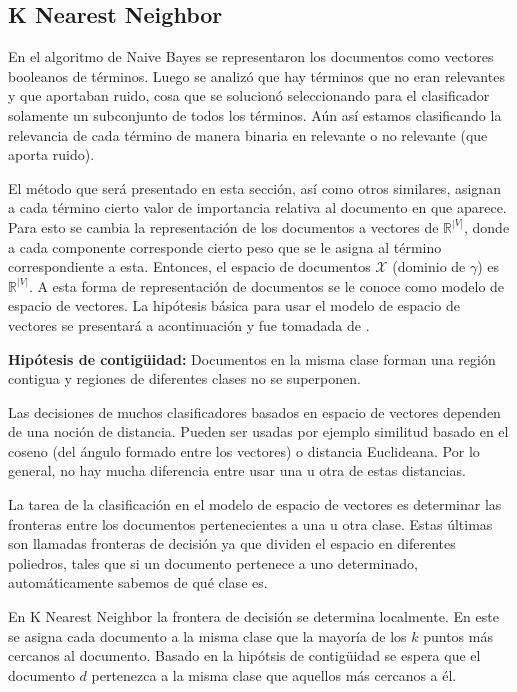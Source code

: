 \documentclass{llncs}
\begin{document}
	\subsection{K Nearest Neighbor}
	
		En el algoritmo de Naive Bayes se representaron los documentos como vectores booleanos de t\'erminos. Luego se analiz\'o que hay t\'erminos que no eran relevantes y que aportaban ruido, cosa que se solucion\'o seleccionando para el clasificador solamente un subconjunto de todos los t\'erminos. A\'un as\'i estamos clasificando la relevancia de cada t\'ermino de manera binaria en relevante o no relevante (que aporta ruido).
		
		 El m\'etodo que ser\'a presentado en esta secci\'on, as\'i como otros similares, asignan a cada t\'ermino cierto valor de importancia relativa al documento en que aparece. Para esto se cambia la representaci\'on de los documentos a vectores de $\mathbb{R}^{|V|}$, donde a cada componente corresponde cierto peso que se le asigna al t\'ermino correspondiente a esta. Entonces, el espacio de documentos $\mathcal{X}$ (dominio de $\gamma$) es $\mathbb{R}^{|V|}$. A esta forma de representaci\'on de documentos se le conoce como modelo de espacio de vectores. La hip\'otesis b\'asica para usar el modelo de espacio de vectores se presentar\'a a acontinuaci\'on y fue tomadada de \cite[p. 289]{B1}.
		 
		 \textbf{Hip\'otesis de contig\"uidad:} Documentos en la misma clase forman una regi\'on contigua  y regiones de diferentes clases no se superponen.
		 
		 Las decisiones de muchos clasificadores basados en espacio de vectores dependen de una noci\'on de distancia. Pueden ser usadas por ejemplo similitud basado en el coseno (del \'angulo formado entre los vectores) o distancia Euclideana. Por lo general, no hay mucha diferencia entre usar una u otra de estas distancias.
		 
		 La tarea de la clasificaci\'on en el modelo de espacio de vectores es determinar las fronteras entre los documentos pertenecientes a una u otra clase. Estas \'ultimas son llamadas fronteras de decisi\'on ya que dividen el espacio en diferentes poliedros, tales que si un documento pertenece a uno determinado, autom\'aticamente sabemos de qu\'e clase es. 
		 
		 En K Nearest Neighbor la frontera de decisi\'on se determina localmente. En este se asigna cada documento a la misma clase que la mayor\'ia de los $k$ puntos m\'as cercanos al documento. Basado en la hip\'otsis de contig\"uidad se espera que el documento $d$ pertenezca a la misma clase que aquellos m\'as cercanos a \'el.
		 
\end{document}
